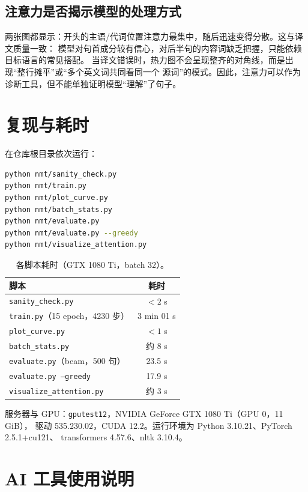 \documentclass[UTF8,a4paper,11pt]{ctexart}
\begin{document}
\subsection{注意力是否揭示模型的处理方式}
两张图都显示：开头的主语/代词位置注意力最集中，随后迅速变得分散。这与译文质量一致：
模型对句首成分较有信心，对后半句的内容词缺乏把握，只能依赖目标语言的常见搭配。
当译文错误时，热力图不会呈现整齐的对角线，而是出现“整行摊平”或“多个英文词共同看同一个
源词”的模式。因此，注意力可以作为诊断工具，但不能单独证明模型“理解”了句子。

\section{复现与耗时}
在仓库根目录依次运行：
\begin{lstlisting}[language=bash,numbers=none]
python nmt/sanity_check.py
python nmt/train.py
python nmt/plot_curve.py
python nmt/batch_stats.py
python nmt/evaluate.py
python nmt/evaluate.py --greedy
python nmt/visualize_attention.py
\end{lstlisting}

\begin{table}[H]
\centering
\caption{各脚本耗时（GTX 1080 Ti，batch 32）。}
\label{tab:time}
\begin{tabular}{lc}
\toprule
脚本 & 耗时 \\
\midrule
\texttt{sanity\_check.py} & $<2$ s \\
\texttt{train.py}（15 epoch，4230 步） & 3 min 01 s \\
\texttt{plot\_curve.py} & $<1$ s \\
\texttt{batch\_stats.py} & 约 8 s \\
\texttt{evaluate.py}（beam，500 句） & 23.5 s \\
\texttt{evaluate.py --greedy} & 17.9 s \\
\texttt{visualize\_attention.py} & 约 3 s \\
\bottomrule
\end{tabular}
\end{table}

服务器与 GPU：\texttt{gputest12}，NVIDIA GeForce GTX 1080 Ti（GPU 0，11 GiB），
驱动 535.230.02，CUDA 12.2。运行环境为 Python 3.10.21、PyTorch 2.5.1+cu121、
transformers 4.57.6、nltk 3.10.4。




\appendix
\section{AI 工具使用说明}
\end{document}
